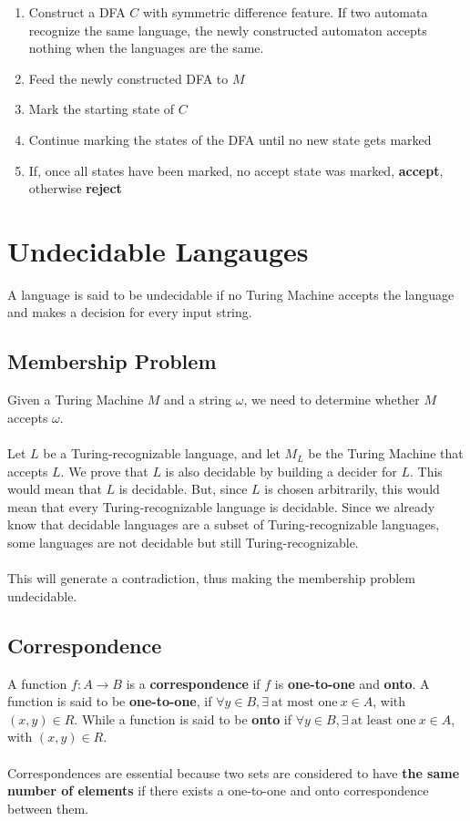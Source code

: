 \documentclass{article}
\begin{document}
\begin{enumerate}
	\item Construct a DFA $C$ with symmetric difference feature. If two automata recognize the same language, the newly constructed automaton accepts nothing when the languages are the same.
	\item Feed the newly constructed DFA to $M$
	\item Mark the starting state of $C$
	\item Continue marking the states of the DFA until no new state gets marked
	\item If, once all states have been marked, no accept state was marked, \textbf{accept}, otherwise \textbf{reject}
\end{enumerate}

\section{Undecidable Langauges}
A language is said to be undecidable if no Turing Machine accepts the language and makes a decision for every input string.

\subsection{Membership Problem}
Given a Turing Machine $M$ and a string $\omega$, we need to determine whether $M$ accepts $\omega$. \\ \\
Let $L$ be a Turing-recognizable language, and let $M_L$ be the Turing Machine that accepts $L$. We prove that $L$ is also decidable by building a decider for $L$. This would mean that $L$ is decidable. But, since $L$ is chosen arbitrarily, this would mean that every Turing-recognizable language is decidable. Since we already know that decidable languages are a subset of Turing-recognizable languages, some languages are not decidable but still Turing-recognizable. \\ \\
This will generate a contradiction, thus making the membership problem undecidable.

\subsection{Correspondence}
A function $f: A \rightarrow B$ is a \textbf{correspondence} if $f$ is \textbf{one-to-one} and \textbf{onto}. A function is said to be \textbf{one-to-one}, if $\forall y \in B, \exists~\text{at most one} ~ x \in A$, with $(x, y) \in R$. While a function is said to be \textbf{onto} if $\forall y \in B, \exists~\text{at least one} ~ x \in A$, with $(x, y) \in R$. \\ \\
Correspondences are essential because two sets are considered to have \textbf{the same number of elements} if there exists a one-to-one and onto correspondence between them.
\end{document}
